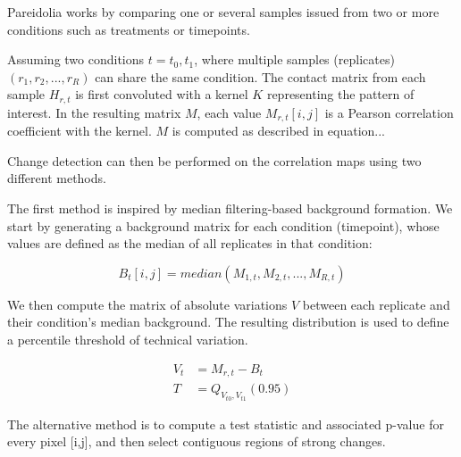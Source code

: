 Pareidolia works by comparing one or several samples issued from two or more conditions such as treatments or timepoints.

Assuming two conditions $t={t_0, t_1}$, where multiple samples (replicates) $(r_1, r_2, ..., r_R)$ can share the same condition. The contact matrix from each sample $H_{r, t}$ is first convoluted with a kernel $K$ representing the pattern of interest. In the resulting matrix $M$, each value $M_{r, t}[i, j]$ is a Pearson correlation coefficient with the kernel. $M$ is computed as described in equation...


Change detection can then be performed on the correlation maps using two different methods.

The first method is inspired by median filtering-based background formation. We start by generating a background matrix for each condition (timepoint), whose values are defined as the median of all replicates in that condition: 

\begin{equation}
    B_t[i, j] = median(M_{1, t}, M_{2, t}, ..., M_{R, t})
\end{equation}

We then compute the matrix of absolute variations $V$ between each replicate and their condition's median background. The resulting distribution is used to define a percentile threshold of technical variation.

\begin{align}
    V_t &= M_{r, t} - B_t \\
    T &= Q_{V_{t0},V_{t1}}(0.95)
\end{align}

The alternative method is to compute a test statistic and associated p-value for every pixel [i,j], and then select contiguous regions of strong changes.